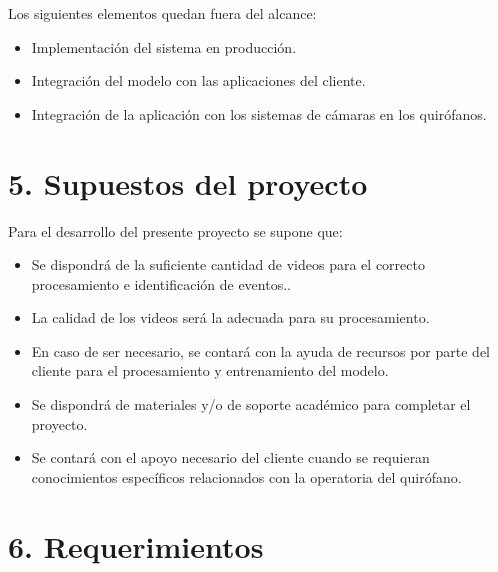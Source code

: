 \documentclass[
11pt, %
]{charter}
\begin{document}
Los siguientes elementos quedan fuera del alcance:
\begin{itemize}
	\item Implementación del sistema en producción.
	\item Integración del modelo con las aplicaciones del cliente.
	\item Integración de la aplicación con los sistemas de cámaras en los quirófanos. 

\end{itemize}



\section{5. Supuestos del proyecto}
\label{sec:supuestos}

Para el desarrollo del presente proyecto se supone que: 

\begin{itemize}
	\item Se dispondrá de la suficiente cantidad de videos para el correcto procesamiento e identificación de eventos..
	\item La calidad de los videos será la adecuada para su procesamiento.
	\item En caso de ser necesario, se contará con la ayuda de recursos por parte del cliente para el procesamiento y entrenamiento del modelo.
	\item Se dispondrá de materiales y/o de soporte académico para completar el proyecto.
	\item Se contará con el apoyo necesario del cliente cuando se requieran conocimientos específicos relacionados con la operatoria del quirófano.
\end{itemize}


\section{6. Requerimientos}
\label{sec:requerimientos}
\end{document}
